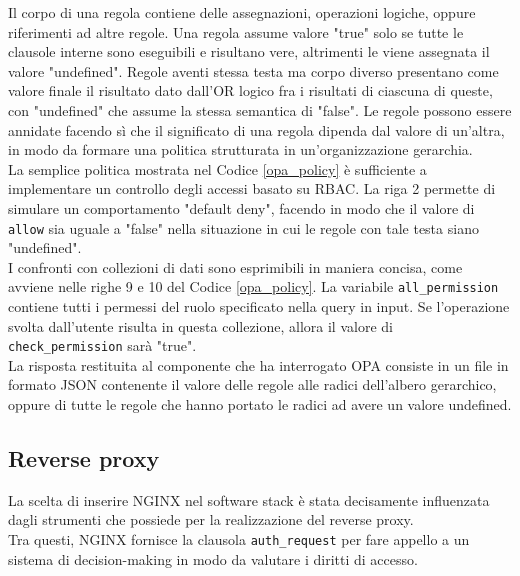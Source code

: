 Il corpo di una regola contiene delle assegnazioni, operazioni logiche, oppure riferimenti ad altre regole. Una regola assume valore "true" 
solo se tutte le clausole interne sono eseguibili e risultano vere, altrimenti le viene assegnata il valore "undefined". Regole aventi stessa testa ma corpo diverso presentano come valore finale 
il risultato dato dall'OR logico fra i risultati di ciascuna di queste, con "undefined" che assume la stessa semantica di "false". 
Le regole possono essere annidate facendo sì che il significato di una regola dipenda dal valore di un'altra, in modo da formare una politica strutturata in un'organizzazione gerarchia. 
\\ La semplice politica mostrata nel Codice \ref*{opa_policy} è sufficiente a implementare 
un controllo degli accessi basato su RBAC. 
La riga 2 permette di simulare un comportamento "default deny", facendo in modo che il valore di \texttt{allow} sia uguale a "false" 
nella situazione in cui le regole con tale testa siano "undefined".  \\ 
I confronti con collezioni di dati sono esprimibili in maniera concisa, come avviene nelle righe 9 e 10 del Codice \ref*{opa_policy}.
La variabile \texttt{all\_permission} contiene tutti i permessi del ruolo specificato nella query in input. 
Se l'operazione svolta dall'utente risulta in questa collezione, allora il valore di \texttt{check\_permission} sarà "true". 
\\ La risposta restituita al componente che ha interrogato OPA consiste in un file in formato JSON contenente il valore 
delle regole alle radici dell'albero gerarchico, oppure di tutte le regole che hanno portato le radici ad avere un valore undefined. 


\subsection{Reverse proxy}
La scelta di inserire NGINX nel software stack è stata decisamente influenzata dagli strumenti che possiede per la realizzazione 
del reverse proxy. 
\\ Tra questi, NGINX fornisce la clausola \texttt{auth\_request} per fare appello a un sistema di decision-making in modo da valutare
i diritti di accesso. 

